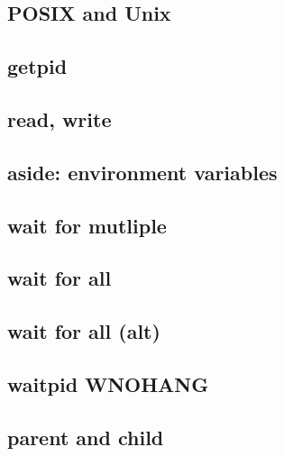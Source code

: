 


\subsection{POSIX and Unix}



\subsection{getpid}



\subsection{read, write}






\subsection{aside: environment variables}


\subsection{wait for mutliple}
 

\subsection{wait for all}


\subsection{wait for all (alt)}


\subsection{waitpid WNOHANG}


\subsection{parent and child}

